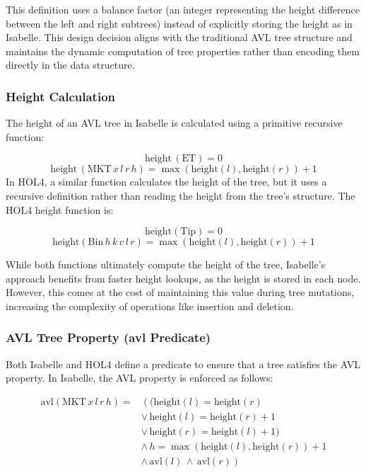 This definition uses a balance factor (an integer representing the height difference between the left and right subtrees) instead of explicitly storing the height as in Isabelle. This design decision aligns with the traditional AVL tree structure and maintains the dynamic computation of tree properties rather than encoding them directly in the data structure.

\subsubsection{Height Calculation}
The height of an AVL tree in Isabelle is calculated using a primitive recursive function:

\[
\text{height} \, (\text{ET}) = 0
\]
\[
\text{height} \, (\text{MKT} \, x \, l \, r \, h) = \max(\text{height}(l), \text{height}(r)) + 1
\]
In HOL4, a similar function calculates the height of the tree, but it uses a recursive definition rather than reading the height from the tree’s structure. The HOL4 height function is:

\[
\text{height}(\text{Tip}) = 0
\]
\[
\text{height}(\text{Bin} \, h \, k \, v \, l \, r) = \max(\text{height}(l), \text{height}(r)) + 1
\]

While both functions ultimately compute the height of the tree, Isabelle’s approach benefits from faster height lookups, as the height is stored in each node. However, this comes at the cost of maintaining this value during tree mutations, increasing the complexity of operations like insertion and deletion.

\subsubsection{AVL Tree Property (avl Predicate)}
Both Isabelle and HOL4 define a predicate to ensure that a tree satisfies the AVL property. In Isabelle, the AVL property is enforced as follows:

\begin{align*}
	\text{avl}(\text{MKT} \, x \, l \, r \, h) = & \left( (\text{height}(l) = \text{height}(r) \right. \\
	& \lor \, \text{height}(l) = \text{height}(r) + 1 \\
	& \lor \, \text{height}(r) = \text{height}(l) + 1) \\
	& \land \, h = \max(\text{height}(l), \text{height}(r)) + 1 \\
	& \land \, \text{avl}(l) \, \land \, \text{avl}(r) \left. \right)
\end{align*}


